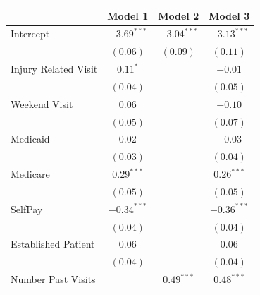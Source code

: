 \documentclass[12pt,twoside]{reedthesis}
\begin{document}
  \singlespacing
  
  \begin{table}
  \begin{center}
  \begin{footnotesize}
  \begin{tabular}{l c c c }
  \hline
   & Model 1 & Model 2 & Model 3 \\
  \hline
  Intercept                     & $\mathbf{-3.69}^{***}$ & $\mathbf{-3.04}^{***}$ & $\mathbf{-3.13}^{***}$ \\
                                & $(0.06)$               & $(0.09)$               & $(0.11)$               \\
  Injury Related Visit          & $0.11^{*}$             &                        & $-0.01$                \\
                                & $(0.04)$               &                        & $(0.05)$               \\
  Weekend Visit                 & $0.06$                 &                        & $-0.10$                \\
                                & $(0.05)$               &                        & $(0.07)$               \\
  Medicaid                      & $0.02$                 &                        & $-0.03$                \\
                                & $(0.03)$               &                        & $(0.04)$               \\
  Medicare                      & $\mathbf{0.29}^{***}$  &                        & $\mathbf{0.26}^{***}$  \\
                                & $(0.05)$               &                        & $(0.05)$               \\
  SelfPay                       & $\mathbf{-0.34}^{***}$ &                        & $\mathbf{-0.36}^{***}$ \\
                                & $(0.04)$               &                        & $(0.04)$               \\
  Established Patient           & $0.06$                 &                        & $0.06$                 \\
                                & $(0.04)$               &                        & $(0.04)$               \\
  Number Past Visits            &                        & $\mathbf{0.49}^{***}$  & $\mathbf{0.48}^{***}$  \\

\end{tabular}
\end{footnotesize}
\end{center}
\end{table}
\end{document}
